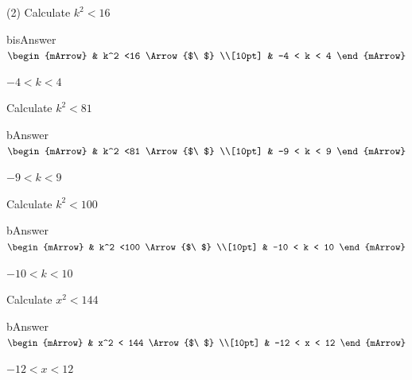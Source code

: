 
\begin{mtask}(2)
    \task Calculate $ k^2 < 16$
              \begin{envOut}[equal height group=A-Rev-1]{bisAnswer}
			       $\begin{mArrow}
			             & k^2 <16      \Arrow{$\ $} \\[10pt]
                         & -4 < k < 4	   
	                \end{mArrow}$
              \end{envOut}			  
			  \begin{exercise}\begin{shortsolution}  
				       $-4 < k < 4$
			  \end{shortsolution}\end{exercise}
			  
    \task Calculate $ k^2 < 81$
              \begin{envOut}[equal height group=A-Rev-1]{bAnswer}
			       $\begin{mArrow}
			             & k^2 <81      \Arrow{$\ $} \\[10pt]
                         & -9 < k < 9	   
	                \end{mArrow}$
              \end{envOut}			  
			  \begin{exercise}\begin{shortsolution}  
				       $-9 < k < 9$
			  \end{shortsolution}\end{exercise}			  

    \task Calculate $ k^2 < 100$
              \begin{envOut}[equal height group=A-Rev-1]{bAnswer}
			       $\begin{mArrow}
			             & k^2 <100      \Arrow{$\ $} \\[10pt]
                         & -10 < k < 10	   
	                \end{mArrow}$
              \end{envOut}			  
			  \begin{exercise}\begin{shortsolution}  
				       $-10 < k < 10$
			  \end{shortsolution}\end{exercise}	

    \task Calculate $ x^2 < 144$
              \begin{envOut}[equal height group=A-Rev-1]{bAnswer}
			       $\begin{mArrow}
			             & x^2 < 144      \Arrow{$\ $} \\[10pt]
                         & -12 < x < 12	   
	                \end{mArrow}$
              \end{envOut}			  
			  \begin{exercise}\begin{shortsolution}  
				       $-12 < x < 12$
			  \end{shortsolution}\end{exercise}					  
\end{mtask}
\clearpage

